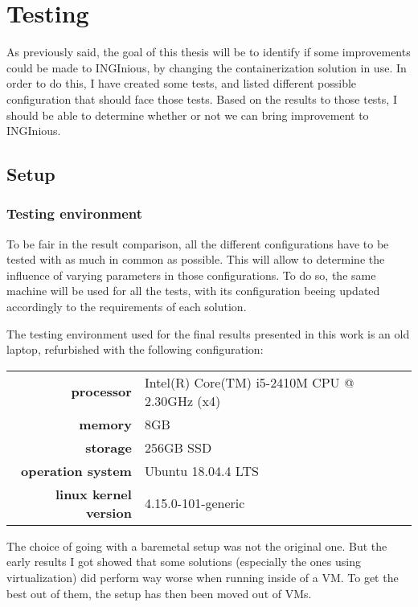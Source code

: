 \chapter{Testing}

As previously said, the goal of this thesis will be to identify if some improvements could be made to INGInious, by changing the containerization solution in use.  In order to do this, I have created some tests, and listed different possible configuration that should face those tests.  Based on the results to those tests, I should be able to determine whether or not we can bring improvement to INGInious.

\section{Setup}
\subsection{Testing environment}
To be fair in the result comparison, all the different configurations have to be tested with as much in common as possible.  This will allow to determine the influence of varying parameters in those configurations.  To do so, the same machine will be used for all the tests, with its configuration beeing updated accordingly to the requirements of each solution.

The testing environment used for the final results presented in this work is an old laptop, refurbished with the following configuration:\\
\begin{tabular}{rl}

  \textbf{processor} & Intel(R) Core(TM) i5-2410M CPU @ 2.30GHz (x4) \\
  \textbf{memory} & 8GB \\
  \textbf{storage} & 256GB SSD \\
  \textbf{operation system} & Ubuntu 18.04.4 LTS \\
  \textbf{linux kernel version} & 4.15.0-101-generic \\

\end{tabular}


The choice of going with a baremetal setup was not the original one.  But the early results I got showed that some solutions (especially the ones using virtualization) did perform way worse when running inside of a VM.  To get the best out of them, the setup has then been moved out of VMs.

